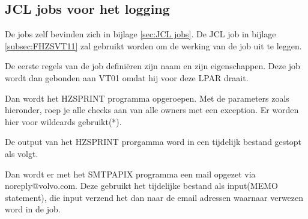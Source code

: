 \subsection{JCL jobs voor het logging}
\label{subsec:JCL jobs voor het logging}

De jobs zelf bevinden zich in bijlage \ref{sec:JCL jobs}. De JCL job in bijlage \ref{subsec:FHZSVT11} zal gebruikt worden om de werking van de job uit te leggen.

De eerste regels van de job definiëren zijn naam en zijn eigenschappen. Deze job wordt dan gebonden aan VT01 omdat hij voor deze LPAR draait.
 \\

Dan wordt het HZSPRINT programma opgeroepen. Met de parameters zoals hieronder, roep je alle checks aan van alle owners met een exception. Er worden hier voor wildcards gebruikt(*). 


De output van het HZSPRINT prorgamma word in een tijdelijk bestand gestopt als volgt.


Dan wordt er met het SMTPAPIX programma een mail opgezet via noreply@volvo.com. Deze gebruikt het tijdelijke bestand als input(MEMO statement), die input verzend het dan naar de email adressen waarnaar verwezen word in de job. 

